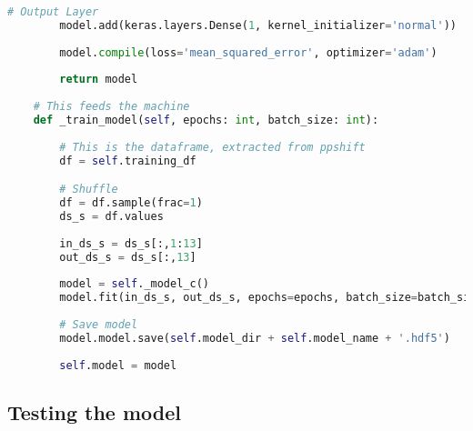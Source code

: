 \begin{lstlisting}[language=Python]
        # Output Layer  
        model.add(keras.layers.Dense(1, kernel_initializer='normal'))
    
        model.compile(loss='mean_squared_error', optimizer='adam')
        
        return model
    
    # This feeds the machine
    def _train_model(self, epochs: int, batch_size: int):
        
        # This is the dataframe, extracted from ppshift
        df = self.training_df 

        # Shuffle
        df = df.sample(frac=1)
        ds_s = df.values
        
        in_ds_s = ds_s[:,1:13]
        out_ds_s = ds_s[:,13]
        
        model = self._model_c()    
        model.fit(in_ds_s, out_ds_s, epochs=epochs, batch_size=batch_size)
        
        # Save model
        model.model.save(self.model_dir + self.model_name + '.hdf5')
        
        self.model = model

\end{lstlisting}

\subsection{Testing the model}

